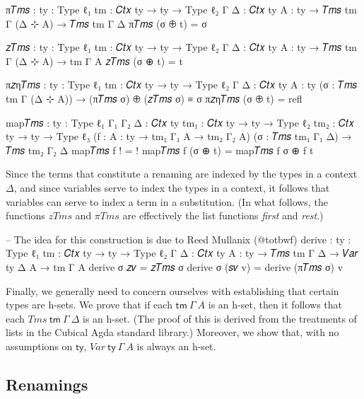\begin{code}[hide]
π𝑇𝑚𝑠 : {ty : Type ℓ₁} {tm : 𝐶𝑡𝑥 ty → ty → Type ℓ₂} {Γ Δ : 𝐶𝑡𝑥 ty} {A : ty}
  → 𝑇𝑚𝑠 tm Γ (Δ ⊹ A) → 𝑇𝑚𝑠 tm Γ Δ
π𝑇𝑚𝑠 (σ ⊕ t) = σ

𝑧𝑇𝑚𝑠 : {ty : Type ℓ₁} {tm : 𝐶𝑡𝑥 ty → ty → Type ℓ₂} {Γ Δ : 𝐶𝑡𝑥 ty} {A : ty}
  → 𝑇𝑚𝑠 tm Γ (Δ ⊹ A) → tm Γ A
𝑧𝑇𝑚𝑠 (σ ⊕ t) = t

π𝑧η𝑇𝑚𝑠 : {ty : Type ℓ₁} {tm : 𝐶𝑡𝑥 ty → ty → Type ℓ₂} {Γ Δ : 𝐶𝑡𝑥 ty} {A : ty}
  (σ : 𝑇𝑚𝑠 tm Γ (Δ ⊹ A)) → (π𝑇𝑚𝑠 σ) ⊕ (𝑧𝑇𝑚𝑠 σ) ≡ σ
π𝑧η𝑇𝑚𝑠 (σ ⊕ t) = refl

map𝑇𝑚𝑠 : {ty : Type ℓ₁} {Γ₁ Γ₂ Δ : 𝐶𝑡𝑥 ty} {tm₁ : 𝐶𝑡𝑥 ty → ty → Type ℓ₂}
  {tm₂ : 𝐶𝑡𝑥 ty → ty → Type ℓ₃} (f : {A : ty} → tm₁ Γ₁ A → tm₂ Γ₂ A)
  (σ : 𝑇𝑚𝑠 tm₁ Γ₁ Δ) → 𝑇𝑚𝑠 tm₂ Γ₂ Δ
map𝑇𝑚𝑠 f ! = !
map𝑇𝑚𝑠 f (σ ⊕ t) = map𝑇𝑚𝑠 f σ ⊕ f t
\end{code}

Since the terms that constitute a renaming are indexed by the types in a context
$\Delta$, and since variables serve to index the types in a context, it follows
that variables can serve to index a term in a substitution. (In what follows,
the functions $\mathit{zTms}$ and $\pi\mathit{Tms}$ are effectively the list
functions \emph{first} and \emph{rest}.)

\begin{code}
-- The idea for this construction is due to Reed Mullanix (@totbwf)
derive : {ty : Type ℓ₁} {tm : 𝐶𝑡𝑥 ty → ty → Type ℓ₂} {Γ Δ : 𝐶𝑡𝑥 ty} {A : ty} →
  𝑇𝑚𝑠 tm Γ Δ → 𝑉𝑎𝑟 ty Δ A → tm Γ A
derive σ 𝑧𝑣 = 𝑧𝑇𝑚𝑠 σ
derive σ (𝑠𝑣 v) = derive (π𝑇𝑚𝑠 σ) v
\end{code}

Finally, we generally need to concern ourselves with establishing that certain
types are h-sets. We prove that if each $\mathsf{tm}~\Gamma~A$ is an h-set, then
it follows that each $\mathit{Tms}~\mathsf{tm}~\Gamma~\Delta$ is an h-set.
(The proof of this is derived from the treatments of lists in the Cubical Agda
standard library.) Moreover, we show that, with no assumptions on $\mathsf{ty}$,
$\mathit{Var}~\mathsf{ty}~\Gamma~A$ is always an h-set.

\subsection{Renamings}

